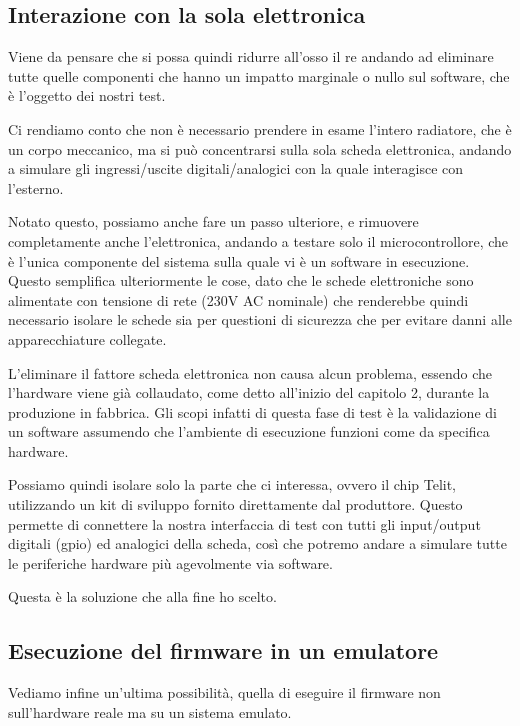 \documentclass[12pt,a4paper,twoside,titlepage]{book}
\begin{document}
\subsection{Interazione con la sola elettronica}

Viene da pensare che si possa quindi ridurre all'osso il \acrshort{re} andando ad eliminare tutte 
quelle componenti che hanno un impatto marginale o nullo sul software, che è l'oggetto dei nostri test. 

Ci rendiamo conto che non è necessario prendere in esame l'intero radiatore, che è un corpo meccanico, 
ma si può concentrarsi sulla sola scheda elettronica, andando a simulare gli ingressi/uscite digitali/analogici
con la quale interagisce con l'esterno. 

Notato questo, possiamo anche fare un passo ulteriore, e rimuovere completamente anche l'elettronica, 
andando a testare solo il microcontrollore, che è l'unica componente del sistema sulla quale vi è un software 
in esecuzione. Questo semplifica ulteriormente le cose, dato che le schede elettroniche sono alimentate 
con tensione di rete (230V AC nominale) che renderebbe quindi necessario isolare le schede sia per questioni 
di sicurezza che per evitare danni alle apparecchiature collegate. 

L'eliminare il fattore scheda elettronica non causa alcun problema, essendo che l'hardware viene già 
collaudato, come detto all'inizio del capitolo 2, durante la produzione in fabbrica. Gli scopi infatti 
di questa fase di test è la validazione di un software assumendo che l'ambiente di esecuzione funzioni 
come da specifica hardware. 

Possiamo quindi isolare solo la parte che ci interessa, ovvero il chip Telit, utilizzando
un kit di sviluppo fornito direttamente dal produttore. Questo permette di connettere
la nostra interfaccia di test con tutti gli input/output digitali (\Gls{gpio}) ed analogici della scheda,
così che potremo andare a simulare tutte le periferiche hardware più agevolmente via software.

Questa è la soluzione che alla fine ho scelto.

\subsection{Esecuzione del firmware in un emulatore}

Vediamo infine un'ultima possibilità, quella di eseguire il \gls{firmware} non sull'hardware
reale ma su un sistema emulato.
\end{document}
